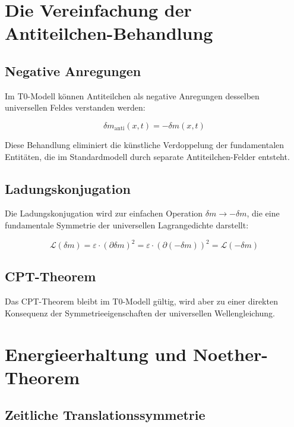 \documentclass[12pt,a4paper]{report}
\begin{document}
	\section{Die Vereinfachung der Antiteilchen-Behandlung}
	
	\subsection{Negative Anregungen}
	
	Im T0-Modell können Antiteilchen als negative Anregungen desselben universellen Feldes verstanden werden:
	
	\begin{equation}
		\delta m_{\text{anti}}(x,t) = -\delta m(x,t)
	\end{equation}
	
	Diese Behandlung eliminiert die künstliche Verdoppelung der fundamentalen Entitäten, die im Standardmodell durch separate Antiteilchen-Felder entsteht.
	
	\subsection{Ladungskonjugation}
	
	Die Ladungskonjugation wird zur einfachen Operation $\delta m \to -\delta m$, die eine fundamentale Symmetrie der universellen Lagrangedichte darstellt:
	
	\begin{equation}
		\mathcal{L}(\delta m) = \varepsilon \cdot (\partial\delta m)^2 = \varepsilon \cdot (\partial(-\delta m))^2 = \mathcal{L}(-\delta m)
	\end{equation}
	
	\subsection{CPT-Theorem}
	
	Das CPT-Theorem bleibt im T0-Modell gültig, wird aber zu einer direkten Konsequenz der Symmetrieeigenschaften der universellen Wellengleichung.
	
	\section{Energieerhaltung und Noether-Theorem}
	
	\subsection{Zeitliche Translationssymmetrie}
	
\end{document}
